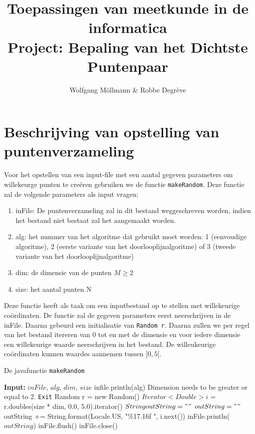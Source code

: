 \documentclass[12pt]{article}
\author{Wolfgang M\"ollmann \& Robbe Degr\`eve}
\title{Toepassingen van meetkunde in de informatica \\ Project: Bepaling van het Dichtste Puntenpaar}
\begin{document}
\maketitle

\newpage

\section{Beschrijving van opstelling van puntenverzameling}
Voor het opstellen van een input-file met een aantal gegeven parameters om willekeurge punten te creëren gebruiken we de functie \texttt{makeRandom}.
Deze functie zal de volgende parameters als input vragen:
\begin{enumerate}
    \item inFile: De puntenverzameling zal in dit bestand weggeschreven worden, indien het bestand niet bestaat zal het aangemaakt worden.
    \item alg: het nummer van het algoritme dat gebruikt moet worden: 1 (eenvoudige algoritme), 2 (eerste variante van het doorlooplijnalgoritme) of 3 (tweede variante van het doorlooplijnalgoritme)
    \item dim: de dimensie van de punten $M \geq 2$
		\item size: het aantal punten N
\end{enumerate}

Deze functie heeft als taak om een inputbestand op te stellen met willekeurige co\"ordinaten.
De functie zal de gegeven parameters eerst neerschrijven in de inFile.
Daarna gebeurd een initialisatie van \texttt{Random r}.
Daarna zullen we per regel van het bestand itereren van 0 tot en met de dimensie en voor iedere dimensie een willekeurige waarde neerschrijven in het bestand.
De willeukeurige co\"ordinaten kunnen waardes aannemen tussen $[0, 5[$.


\begin{algorithm}
\caption{De javafunctie \texttt{makeRandom}}
\begin{algorithmic}
\STATE \textbf{Input:} $inFile$, $alg$, $dim$, $size$
\STATE infile.println(alg)
	\PRINT Dimension needs to be greater or equal to 2.
	\STATE \texttt{Exit}
\ENDIF
\STATE Random r = new Random()
\STATE $Iterator<Double> i$ = r.doubles(size * dim, 0.0, 5.0).iterator()
\STATE $String outString = ""$
	\STATE $outString = ""$
		\STATE outString += String.format(Locale.US, "\%17.16f ", i.next())
	\ENDFOR
	\STATE inFile.println($outString$)
\ENDWHILE
\STATE inFile.flush()
\STATE inFile.close()
\end{algorithmic}
\end{algorithm}
\end{document}
